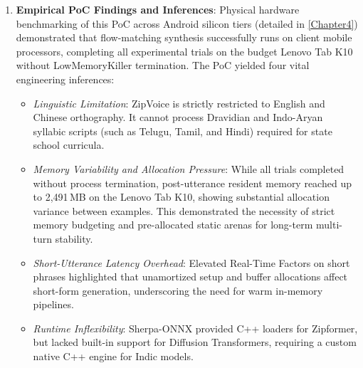 \begin{enumerate}
    \item \textbf{Empirical PoC Findings and Inferences}:
    Physical hardware benchmarking of this PoC across Android silicon tiers (detailed in \cref{Chapter4}) demonstrated that flow-matching synthesis successfully runs on client mobile processors, completing all experimental trials on the budget Lenovo Tab K10 without LowMemoryKiller termination. The PoC yielded four vital engineering inferences:
    \begin{itemize}
        \item \textit{Linguistic Limitation}: ZipVoice is strictly restricted to English and Chinese orthography. It cannot process Dravidian and Indo-Aryan syllabic scripts (such as Telugu, Tamil, and Hindi) required for state school curricula.
        \item \textit{Memory Variability and Allocation Pressure}: While all trials completed without process termination, post-utterance resident memory reached up to 2,491\,MB on the Lenovo Tab K10, showing substantial allocation variance between examples. This demonstrated the necessity of strict memory budgeting and pre-allocated static arenas for long-term multi-turn stability.
        \item \textit{Short-Utterance Latency Overhead}: Elevated Real-Time Factors on short phrases highlighted that unamortized setup and buffer allocations affect short-form generation, underscoring the need for warm in-memory pipelines.
        \item \textit{Runtime Inflexibility}: Sherpa-ONNX provided C++ loaders for Zipformer, but lacked built-in support for Diffusion Transformers, requiring a custom native C++ engine for Indic models.
    \end{itemize}
    

\end{enumerate}
